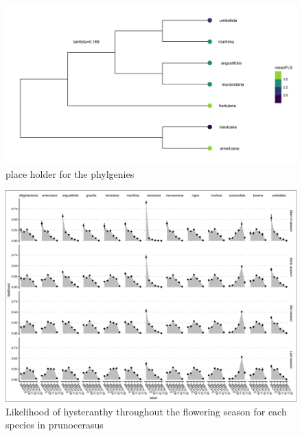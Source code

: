 \documentclass{article}\usepackage[]{graphicx}\usepackage[]{color}
\begin{document}
\begin{figure}[h!]
    \centering
 \includegraphics[width=\textwidth]{..//..//Plots/phylosig1.jpeg}
    \caption{place holder for the phylgenies }
    \label{fig:phylo}
\end{figure}

\begin{figure}[h!]
    \centering
 \includegraphics[width=\textwidth]{..//..//Plots/ord_quants.jpeg}
    \caption{ Likelihood of hysteranthy throughout the flowering season for each species in prunocerasus}
    \label{fig:plums}
\end{figure}
\end{document}
